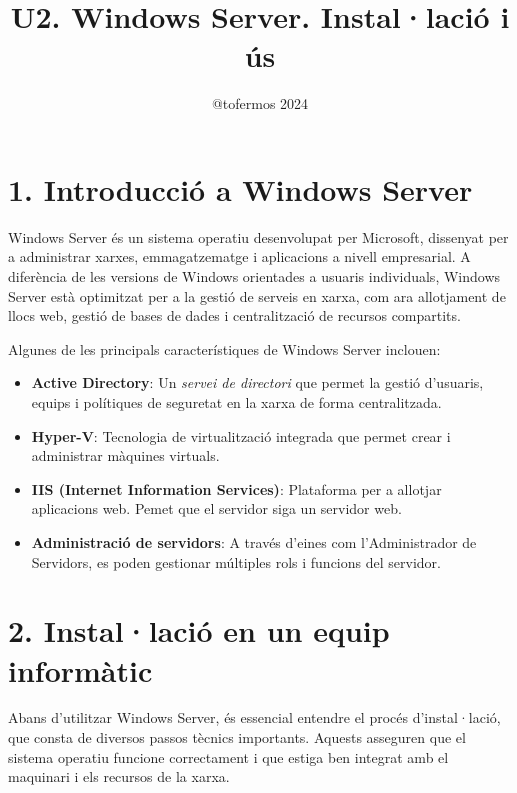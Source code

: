 \documentclass[
  a4paper,
]{article}
\title{U2. Windows Server. Instal·lació i ús}
\author{@tofermos 2024}
\date{}
\begin{document}
\maketitle

{
\setcounter{tocdepth}{2}
\tableofcontents
}
\newpage
\renewcommand\tablename{Tabla}

\section{1. Introducció a Windows
Server}\label{introducciuxf3-a-windows-server}

Windows Server és un sistema operatiu desenvolupat per Microsoft,
dissenyat per a administrar xarxes, emmagatzematge i aplicacions a
nivell empresarial. A diferència de les versions de Windows orientades a
usuaris individuals, Windows Server està optimitzat per a la gestió de
serveis en xarxa, com ara allotjament de llocs web, gestió de bases de
dades i centralització de recursos compartits.

Algunes de les principals característiques de Windows Server inclouen:

\begin{itemize}
\item
  \textbf{Active Directory}: Un \emph{servei de directori} que permet la
  gestió d'usuaris, equips i polítiques de seguretat en la xarxa de
  forma centralitzada.
\item
  \textbf{Hyper-V}: Tecnologia de virtualització integrada que permet
  crear i administrar màquines virtuals.
\item
  \textbf{IIS (Internet Information Services)}: Plataforma per a
  allotjar aplicacions web. Pemet que el servidor siga un servidor web.
\item
  \textbf{Administració de servidors}: A través d'eines com
  l'Administrador de Servidors, es poden gestionar múltiples rols i
  funcions del servidor.
\end{itemize}

\section{2. Instal·lació en un equip
informàtic}\label{installaciuxf3-en-un-equip-informuxe0tic}

Abans d'utilitzar Windows Server, és essencial entendre el procés
d'instal·lació, que consta de diversos passos tècnics importants.
Aquests asseguren que el sistema operatiu funcione correctament i que
estiga ben integrat amb el maquinari i els recursos de la xarxa.
\end{document}
